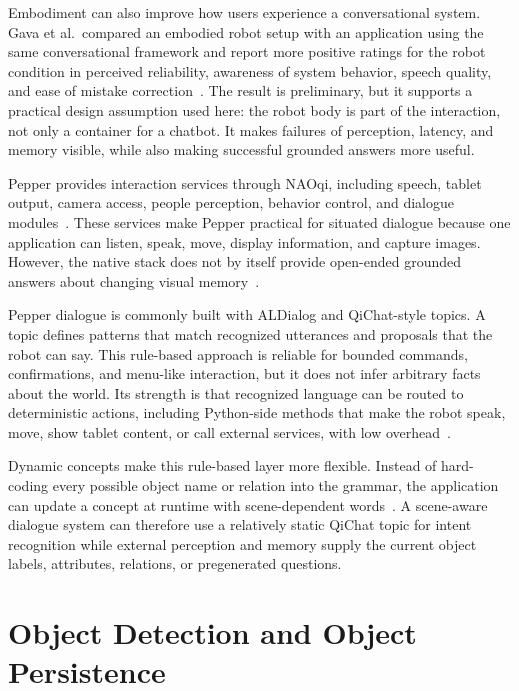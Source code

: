 Embodiment can also improve how users experience a conversational system. Gava et al.\ compared an embodied robot setup with an application using the same conversational framework and report more positive ratings for the robot condition in perceived reliability, awareness of system behavior, speech quality, and ease of mistake correction~\cite{gava2024physical}. The result is preliminary, but it supports a practical design assumption used here: the robot body is part of the interaction, not only a container for a chatbot. It makes failures of perception, latency, and memory visible, while also making successful grounded answers more useful.

Pepper provides interaction services through NAOqi, including speech, tablet output, camera access, people perception, behavior control, and dialogue modules~\cite{softbank_python_sdk_2026}. These services make Pepper practical for situated dialogue because one application can listen, speak, move, display information, and capture images. However, the native stack does not by itself provide open-ended grounded answers about changing visual memory~\cite{softbank_alspeechrecognition_2026}.

Pepper dialogue is commonly built with ALDialog and QiChat-style topics. A topic defines patterns that match recognized utterances and proposals that the robot can say. This rule-based approach is reliable for bounded commands, confirmations, and menu-like interaction, but it does not infer arbitrary facts about the world. Its strength is that recognized language can be routed to deterministic actions, including Python-side methods that make the robot speak, move, show tablet content, or call external services, with low overhead~\cite{noauthor_qichat_nodate}.

Dynamic concepts make this rule-based layer more flexible. Instead of hard-coding every possible object name or relation into the grammar, the application can update a concept at runtime with scene-dependent words~\cite{noauthor_qichat_nodate}. A scene-aware dialogue system can therefore use a relatively static QiChat topic for intent recognition while external perception and memory supply the current object labels, attributes, relations, or pregenerated questions.

\section{Object Detection and Object Persistence}\label{sec:object-detection-tracking-reid}


